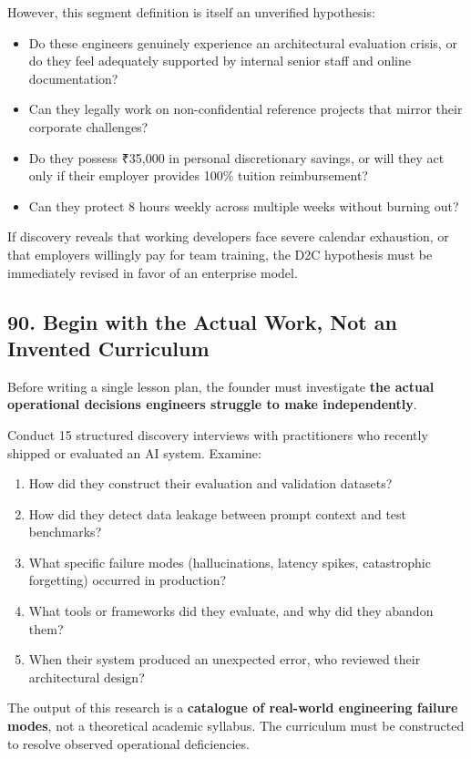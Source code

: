 However, this segment definition is itself an unverified hypothesis:
\begin{itemize}
    \item Do these engineers genuinely experience an architectural evaluation crisis, or do they feel adequately supported by internal senior staff and online documentation?
    \item Can they legally work on non-confidential reference projects that mirror their corporate challenges?
    \item Do they possess ₹35,000 in personal discretionary savings, or will they act only if their employer provides 100\% tuition reimbursement?
    \item Can they protect 8 hours weekly across multiple weeks without burning out?
\end{itemize}

If discovery reveals that working developers face severe calendar exhaustion, or that employers willingly pay for team training, the D2C hypothesis must be immediately revised in favor of an enterprise model.

\subsection*{90. Begin with the Actual Work, Not an Invented Curriculum}

Before writing a single lesson plan, the founder must investigate \textbf{the actual operational decisions engineers struggle to make independently}.

Conduct 15 structured discovery interviews with practitioners who recently shipped or evaluated an AI system. Examine:
\begin{enumerate}
    \item How did they construct their evaluation and validation datasets?
    \item How did they detect data leakage between prompt context and test benchmarks?
    \item What specific failure modes (hallucinations, latency spikes, catastrophic forgetting) occurred in production?
    \item What tools or frameworks did they evaluate, and why did they abandon them?
    \item When their system produced an unexpected error, who reviewed their architectural design?
\end{enumerate}

The output of this research is a \textbf{catalogue of real-world engineering failure modes}, not a theoretical academic syllabus. The curriculum must be constructed to resolve observed operational deficiencies.

